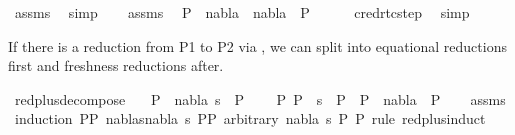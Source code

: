 \begin{isabellebody}
\ assms{\isacharparenleft}{\kern0pt}{}{\isacharparenright}{\kern0pt}\ \isamarkupfalse%
\ simp\isanewline
\ \ \isamarkupfalse%
\ assms{\isacharparenleft}{\kern0pt}{}{\isacharparenright}{\kern0pt}\ \isamarkupfalse%
\ {\isachardoublequoteopen}P{}\ {\isasymturnstile}\ {\isacharparenleft}{\kern0pt}nabla{}\ {\isasymunion}\ nabla{}{\isacharparenright}{\kern0pt}\ {\isasymrightarrow}\isactrlsup {\isacharasterisk}{\kern0pt}\ P{}{\isachardoublequoteclose}\isanewline
\ \ \ \ \isamarkupfalse%
\ cred{\isacharunderscore}{\kern0pt}rtc{\isacharunderscore}{\kern0pt}step\ \isamarkupfalse%
\ simp\isanewline
{}\isamarkupfalse%
%
\endisatagproof
{\isafoldproof}%
%
\isadelimproof
%
\endisadelimproof
%
\begin{isamarkuptext}%
If there is a reduction from P1 to P2 via , we can split into equational reductions
first and freshness reductions after.%
\end{isamarkuptext}\isamarkuptrue%
\isamarkupfalse%
\ red{\isacharunderscore}{\kern0pt}plus{\isacharunderscore}{\kern0pt}decompose{\isacharcolon}{\kern0pt}\isanewline
\ \ \ {\isachardoublequoteopen}P{}\ {\isasymTurnstile}\ {\isacharparenleft}{\kern0pt}nabla{\isacharcomma}{\kern0pt}\ s{\isacharparenright}{\kern0pt}\ {\isasymRightarrow}\ P{}{\isachardoublequoteclose}\isanewline
\ \ \ {\isachardoublequoteopen}{\isasymexists}\ P{}{\isachardot}{\kern0pt}\ P{}\ {\isasymturnstile}\ s\ {\isasymleadsto}\isactrlsup {\isacharasterisk}{\kern0pt}\ P{}\ {\isasymand}\ P{}\ {\isasymturnstile}\ nabla\ {\isasymrightarrow}\isactrlsup {\isacharasterisk}{\kern0pt}\ P{}{\isachardoublequoteclose}\isanewline
%
\isadelimproof
\ \ %
\endisadelimproof
%
\isatagproof
{}\isamarkupfalse%
\ assms\isanewline
{}\isamarkupfalse%
\ {\isacharparenleft}{\kern0pt}induction\ P{}{\isasymequiv}{\isachardoublequoteopen}P{}{\isachardoublequoteclose}\ nablas{\isasymequiv}{\isachardoublequoteopen}{\isacharparenleft}{\kern0pt}nabla{\isacharcomma}{\kern0pt}\ s{\isacharparenright}{\kern0pt}{\isachardoublequoteclose}\ P{}{\isasymequiv}{\isachardoublequoteopen}P{}{\isachardoublequoteclose}\ arbitrary{\isacharcolon}{\kern0pt}\ nabla\ s\ P{}\ P{}\ rule{\isacharcolon}{\kern0pt}\ red{\isacharunderscore}{\kern0pt}plus{\isachardot}{\kern0pt}induct{\isacharparenright}{\kern0pt}\isanewline

\end{isabellebody}
